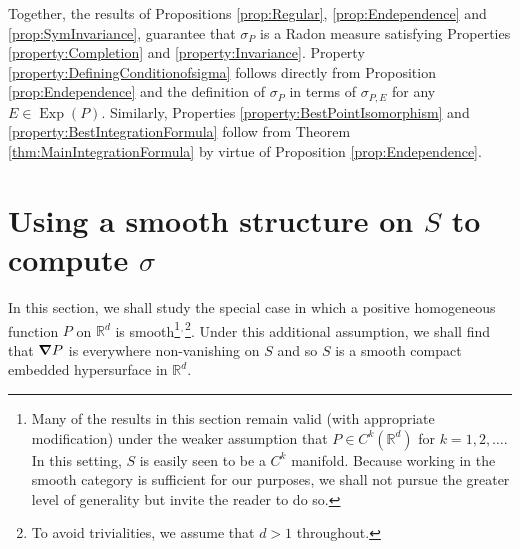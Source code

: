 \documentclass[smallextended]{svjour3}
\theoremstyle{remark}
\renewenvironment{proof}[1][\proofname]{\renewcommand\xproofname{#1}\xproof}{\endxproof}
\newcommand\Exp{\operatorname{Exp}}
\begin{document}
\begin{proof}[Proof of Theorem \ref{thm:BestIntegrationFormula}]
Together, the results of Propositions \ref{prop:Regular}, \ref{prop:Endependence} and \ref{prop:SymInvariance}, guarantee that $\sigma_P$ is a Radon measure satisfying Properties \ref{property:Completion} and \ref{property:Invariance}. Property \ref{property:DefiningConditionofsigma} follows directly from Proposition \ref{prop:Endependence} and the definition of $\sigma_P$ in terms of $\sigma_{P,E}$ for any $E\in\Exp(P)$. Similarly, Properties \ref{property:BestPointIsomorphism} and \ref{property:BestIntegrationFormula} follow from Theorem \ref{thm:MainIntegrationFormula} by virtue of Proposition \ref{prop:Endependence}. 
\end{proof}

















\section{Using a smooth structure on $S$ to compute $\sigma$}\label{sec:SigmaForSmoothP}

\noindent In this section, we shall study the special case in which a positive homogeneous function $P$ on $\mathbb{R}^d$ is smooth\footnote{Many of the results in this section remain valid (with appropriate modification) under the weaker assumption that $P\in C^k(\mathbb{R}^d)$ for $k=1,2,\dots$. In this setting, $S$ is easily seen to be a $C^k$ manifold. Because working in the smooth category is sufficient for our purposes, we shall not pursue the greater level of generality but invite the reader to do so.}$^{\mbox{\tiny{,}}}$\footnote{To avoid trivialities, we assume that $d>1$ throughout.}.
Under this additional assumption, we shall find that $\grad P$ is everywhere non-vanishing on $S$ and so $S$ is a smooth compact embedded hypersurface in $\mathbb{R}^d$.\\
\end{document}
